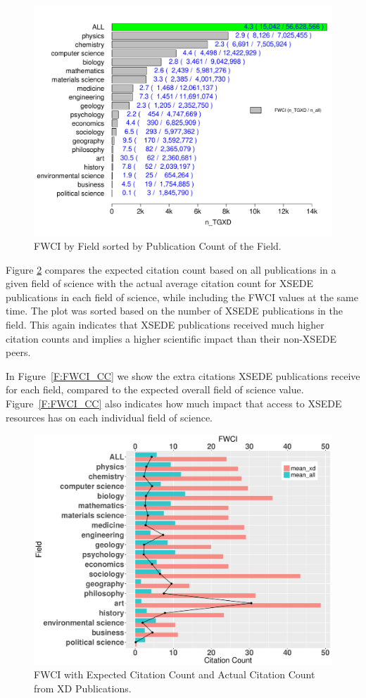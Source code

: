 \documentclass{sig-alternate}
\begin{document}
\begin{figure}[htb!]
  \centering
    \includegraphics[width=0.95\columnwidth]{images/fwci_nxd.pdf}
    \caption{FWCI by Field sorted by Publication Count of the Field.}
    \label{F:fwci_nxd}
\end{figure}

Figure \ref{F:FWCIwCC} compares the expected citation count based on
all publications in a given field of science with the actual average
citation count for XSEDE publications in each field of science, while
including the FWCI values at the same time. The plot was sorted based
on the number of XSEDE publications in the field. This
again indicates that XSEDE publications received much higher citation
counts and implies a higher scientific impact than their non-XSEDE
peers.

In Figure~\ref{F:FWCI_CC} we show the extra citations XSEDE
publications receive for each field, compared to the expected overall
field of science value. Figure~\ref{F:FWCI_CC} also indicates how much
impact that access to XSEDE resources has on each individual field of
science.

\begin{figure}[htb!]
  \centering
    \includegraphics[width=0.95\columnwidth]{images/FWCIwCC.pdf}
    \caption{FWCI with Expected Citation Count and Actual Citation Count from XD Publications.}
    \label{F:FWCIwCC}
\end{figure}
\end{document}
